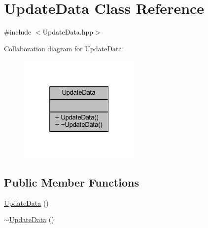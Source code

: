 \hypertarget{class_update_data}{\section{Update\-Data Class Reference}
\label{class_update_data}
}


{\ttfamily \#include $<$Update\-Data.\-hpp$>$}



Collaboration diagram for Update\-Data\-:\nopagebreak
\begin{figure}[H]
\begin{center}
\leavevmode
\includegraphics[width=169pt]{class_update_data__coll__graph}
\end{center}
\end{figure}
\subsection*{Public Member Functions}
\begin{DoxyCompactItemize}
\item 
\hyperlink{class_update_data_a7164bb9338d6362f427d75025c9026b6}{Update\-Data} ()
\item 
\hyperlink{class_update_data_ab2e57f8fd741b289c7719ab860706ff6}{$\sim$\-Update\-Data} ()
\end{DoxyCompactItemize}


